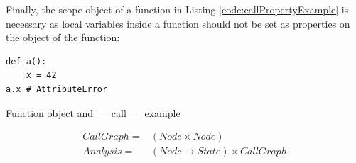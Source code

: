 Finally, the scope object of a function in Listing \ref{code:callPropertyExample} is necessary as local variables inside a function should not be set as properties on the object of the function:
\begin{listing}[H]
	\begin{verbatim}
def a(): 
	x = 42
a.x # AttributeError
	\end{verbatim}
\caption{Function object and \_\_call\_\_ example}\label{code:callPropertyExample}
\end{listing}
\begin{eqnarray*}
CallGraph =& (Node \times Node) \\
Analysis =& (Node \rightarrow State) \times CallGraph
\end{eqnarray*}



